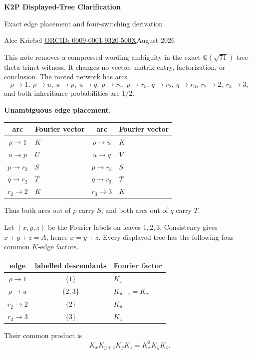 \documentclass[10pt]{article}
\begin{document}
\begin{center}
{\Large\bfseries K2P Displayed-Tree Clarification}\par
{\large Exact edge placement and four-switching derivation}\par
Alec Kriebel \quad \href{https://orcid.org/0009-0001-9320-500X}{ORCID: 0009-0001-9320-500X}\hfill August 2026
\end{center}

This note removes a compressed wording ambiguity in the exact $\mathbb Q(\sqrt{71})$ tree--theta-trinet witness. It changes no vector, matrix entry, factorization, or conclusion. The rooted network has arcs
\[
\rho\to1,\ \rho\to u,\ u\to p,\ u\to q,\ p\to r_2,\ p\to r_3,\ q\to r_2,\ q\to r_3,\ r_2\to2,\ r_3\to3,
\]
and both inheritance probabilities are $1/2$.

\textbf{Unambiguous edge placement.}
\begin{center}
\small
\begin{tabular}{@{}cl@{\qquad}cl@{}}
\toprule
arc&Fourier vector&arc&Fourier vector\\
\midrule
$\rho\to1$&$K$&$\rho\to u$&$K$\\
$u\to p$&$U$&$u\to q$&$V$\\
$p\to r_2$&$S$&$p\to r_3$&$S$\\
$q\to r_2$&$T$&$q\to r_3$&$T$\\
$r_2\to2$&$K$&$r_3\to3$&$K$\\
\bottomrule
\end{tabular}
\end{center}
Thus both arcs out of $p$ carry $S$, and both arcs out of $q$ carry $T$.

Let $(x,y,z)$ be the Fourier labels on leaves $1,2,3$. Consistency gives $x+y+z=A$, hence $x=y+z$. Every displayed tree has the following four common $K$-edge factors.
\begin{center}
\small
\begin{tabular}{@{}ccl@{}}
\toprule
edge&labelled descendants&Fourier factor\\
\midrule
$\rho\to1$&$\{1\}$&$K_x$\\
$\rho\to u$&$\{2,3\}$&$K_{y+z}=K_x$\\
$r_2\to2$&$\{2\}$&$K_y$\\
$r_3\to3$&$\{3\}$&$K_z$\\
\bottomrule
\end{tabular}
\end{center}
Their common product is
\[
K_xK_{y+z}K_yK_z=K_x^2K_yK_z.
\]
\end{document}
